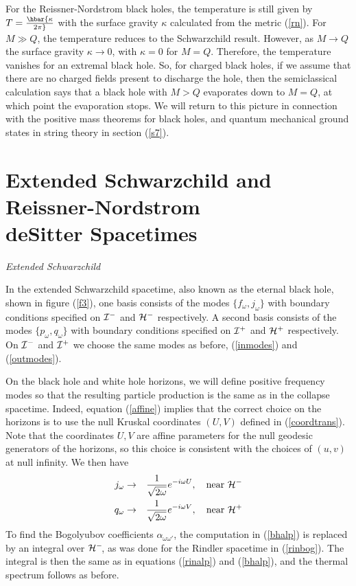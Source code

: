 \documentclass[12pt]{article}
\newcommand{\p}{\partial}
\newcommand{\sectiono}[1]{\section{#1}\setcounter{equation}{0}}
\def\bena{\begin{eqnarray}}
\def\eena{\end{eqnarray}}
\def\fh{{\cal H}^+}
\def\ph{{\cal H}^-}
\def\finf{{\cal I}^+}
\def\pinf{{\cal I}^-}
\def\f{f_{\omega}}
\def\p{p_{\omega}}
\def\q{q_{\omega}}
\def\j{j_{\omega}}
\def\alp{\alpha _{\omega \omega '}}
\begin{document}
For the Reissner-Nordstrom black holes, the temperature is still given by
$T=\hbar
{\kappa\over 2\pi}$ with the surface gravity $\kappa$ calculated from the
metric (\ref{rn}).
For $M\gg Q$, the
temperature reduces to the Schwarzchild result.  However, as $M\rightarrow
Q $ the surface
gravity  $\kappa\rightarrow 0$, with $\kappa =0$ for $M=Q$.
Therefore, the temperature vanishes for an extremal black hole. So, for
charged black holes, if we assume that
there are no charged fields present to discharge the hole, then the
semiclassical calculation says
that a black hole with $M>Q$ evaporates down to $M=Q$, at which point the
evaporation stops.
We will return to this picture in connection with the positive mass
theorems for black
holes, and quantum mechanical ground states in  string theory in section (\ref{s7}).

\sectiono{Extended Schwarzchild and Reissner-Nordstrom\\ deSitter Spacetimes}
\label{section6}

\vskip 0.1in\noindent
{\it Extended Schwarzchild}
\vskip 0.05in

In the extended Schwarzchild spacetime, also known as the eternal black hole,
shown in figure (\ref{f3}), one basis
consists of the modes $\{\f,\j\}$ with boundary conditions specified on
$\pinf$ and $\ph$ respectively.  A
second basis consists of the modes $\{ \p ,\q \}$ with boundary conditions
specified on
$\finf$ and $\fh$ respectively.  On $\pinf$ and $\finf$ we choose the
same modes as before, (\ref{inmodes}) and (\ref{outmodes}).

On the black hole and white hole horizons, we will define positive
frequency modes so that the resulting particle production is the same as
in the collapse spacetime.  Indeed, equation (\ref{affine}) implies that
the correct
choice on the horizons is to use the null Kruskal coordinates $(U,V)$ defined
in (\ref{coordtrans}).  Note that the coordinates $U,V$ are affine
parameters for the null
geodesic generators of the horizons, so this choice is consistent with the
choices of $(u,v)$ at null infinity.  We then have
%
\bena\label{jpmodes} \j &\rightarrow &{1\over \sqrt{2\omega}}e^{-i\omega U},
\quad {\rm near} \  \ph \\
\q &\rightarrow &{1\over \sqrt{2\omega}}e^{-i\omega V}, \quad {\rm near} \
\fh \eena
%
To find the Bogolyubov coefficients $\alp$, the computation in
(\ref{bhalp})  is replaced by
an integral over $\ph\!$, as was done for the Rindler spacetime in
(\ref{rinbog}).
The integral is then the same as in equations (\ref{rinalp})  and
(\ref{bhalp}), and the thermal
spectrum follows as before.
\end{document}
